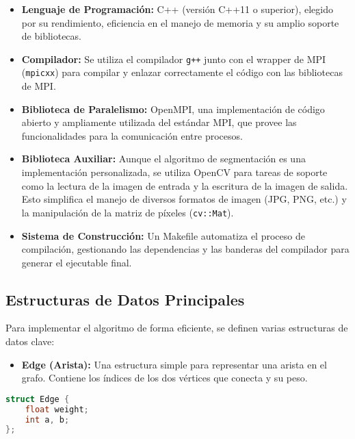 \documentclass[fleqn,10pt]{article}
\begin{document}
\begin{itemize}
    \item \textbf{Lenguaje de Programación:} C++ (versión C++11 o superior), elegido por su rendimiento, eficiencia en el manejo de memoria y su amplio soporte de bibliotecas.
    \item \textbf{Compilador:} Se utiliza el compilador \texttt{g++} junto con el wrapper de MPI (\texttt{mpicxx}) para compilar y enlazar correctamente el código con las bibliotecas de MPI.
    \item \textbf{Biblioteca de Paralelismo:} OpenMPI, una implementación de código abierto y ampliamente utilizada del estándar MPI, que provee las funcionalidades para la comunicación entre procesos.
    \item \textbf{Biblioteca Auxiliar:} Aunque el algoritmo de segmentación es una implementación personalizada, se utiliza OpenCV para tareas de soporte como la lectura de la imagen de entrada y la escritura de la imagen de salida. Esto simplifica el manejo de diversos formatos de imagen (JPG, PNG, etc.) y la manipulación de la matriz de píxeles (\texttt{cv::Mat}).
    \item \textbf{Sistema de Construcción:} Un Makefile automatiza el proceso de compilación, gestionando las dependencias y las banderas del compilador para generar el ejecutable final.
\end{itemize}

\subsection{Estructuras de Datos Principales}
Para implementar el algoritmo de forma eficiente, se definen varias estructuras de datos clave:

\begin{itemize}
    \item \textbf{Edge (Arista):} Una estructura simple para representar una arista en el grafo. Contiene los índices de los dos vértices que conecta y su peso.
\end{itemize}

\begin{lstlisting}[language=C++, caption={Estructura Edge}]
struct Edge {
    float weight;
    int a, b;
};
\end{lstlisting}
\end{document}
